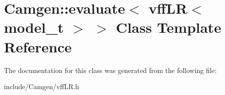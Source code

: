 \hypertarget{a00204}{\section{Camgen\-:\-:evaluate$<$ vff\-L\-R$<$ model\-\_\-t $>$ $>$ Class Template Reference}
\label{a00204}
}


The documentation for this class was generated from the following file\-:\begin{DoxyCompactItemize}
\item 
include/\-Camgen/vff\-L\-R.\-h\end{DoxyCompactItemize}
